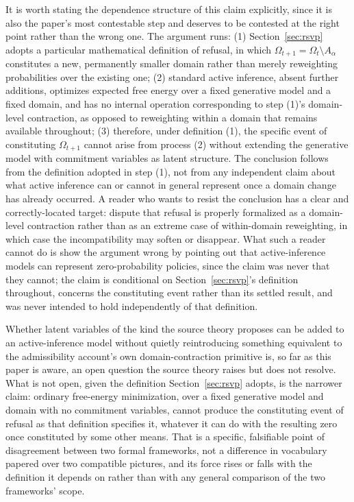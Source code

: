 \documentclass[11pt]{article}
\theoremstyle{plain}
\begin{document}
It is worth stating the dependence structure of this claim explicitly, since it is also the paper's most contestable step and deserves to be contested at the right point rather than the wrong one. The argument runs: (1) Section~\ref{sec:rsvp} adopts a particular mathematical definition of refusal, in which $\Omega_{t+1} = \Omega_t \setminus A_\alpha$ constitutes a new, permanently smaller domain rather than merely reweighting probabilities over the existing one; (2) standard active inference, absent further additions, optimizes expected free energy over a fixed generative model and a fixed domain, and has no internal operation corresponding to step (1)'s domain-level contraction, as opposed to reweighting within a domain that remains available throughout; (3) therefore, under definition (1), the specific event of constituting $\Omega_{t+1}$ cannot arise from process (2) without extending the generative model with commitment variables as latent structure. The conclusion follows from the definition adopted in step (1), not from any independent claim about what active inference can or cannot in general represent once a domain change has already occurred. A reader who wants to resist the conclusion has a clear and correctly-located target: dispute that refusal is properly formalized as a domain-level contraction rather than as an extreme case of within-domain reweighting, in which case the incompatibility may soften or disappear. What such a reader cannot do is show the argument wrong by pointing out that active-inference models can represent zero-probability policies, since the claim was never that they cannot; the claim is conditional on Section~\ref{sec:rsvp}'s definition throughout, concerns the constituting event rather than its settled result, and was never intended to hold independently of that definition.

Whether latent variables of the kind the source theory proposes can be added to an active-inference model without quietly reintroducing something equivalent to the admissibility account's own domain-contraction primitive is, so far as this paper is aware, an open question the source theory raises but does not resolve. What is not open, given the definition Section~\ref{sec:rsvp} adopts, is the narrower claim: ordinary free-energy minimization, over a fixed generative model and domain with no commitment variables, cannot produce the constituting event of refusal as that definition specifies it, whatever it can do with the resulting zero once constituted by some other means. That is a specific, falsifiable point of disagreement between two formal frameworks, not a difference in vocabulary papered over two compatible pictures, and its force rises or falls with the definition it depends on rather than with any general comparison of the two frameworks' scope.
\end{document}
